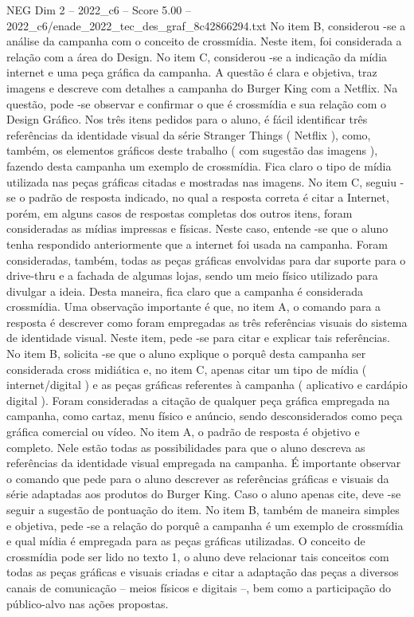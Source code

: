 \begin{textsample}{NEG Dim 2 – 2022\_c6 – Score 5.00 – 2022\_c6/enade\_2022\_tec\_des\_graf\_8c42866294.txt}
No item B, considerou -se a análise da campanha com o conceito de crossmídia.
Neste item, foi considerada a relação com a área do Design.
No item C, considerou -se a indicação da mídia internet e uma peça gráfica da campanha.
A questão é clara e objetiva, traz imagens e descreve com detalhes a campanha do Burger King com a Netflix.
Na questão, pode -se observar e confirmar o que é crossmídia e sua relação com o Design Gráfico.
Nos três itens pedidos para o aluno, é fácil identificar três referências da identidade visual da série Stranger Things ( Netflix ), como, também, os elementos gráficos deste trabalho ( com sugestão das imagens ), fazendo desta campanha um exemplo de crossmídia.
Fica claro o tipo de mídia utilizada nas peças gráficas citadas e mostradas nas imagens.
No item C, seguiu -se o padrão de resposta indicado, no qual a resposta correta é citar a Internet, porém, em alguns casos de respostas completas dos outros itens, foram consideradas as mídias impressas e físicas.
Neste caso, entende -se que o aluno tenha respondido anteriormente que a internet foi usada na campanha.
Foram consideradas, também, todas as peças gráficas envolvidas para dar suporte para o drive-thru e a fachada de algumas lojas, sendo um meio físico utilizado para divulgar a ideia.
Desta maneira, fica claro que a campanha é considerada crossmídia.
Uma observação importante é que, no item A, o comando para a resposta é descrever como foram empregadas as três referências visuais do sistema de identidade visual.
Neste item, pede -se para citar e explicar tais referências.
No item B, solicita -se que o aluno explique o porquê desta campanha ser considerada cross midiática e, no item C, apenas citar um tipo de mídia ( internet/digital ) e as peças gráficas referentes à campanha ( aplicativo e cardápio digital ).
Foram consideradas a citação de qualquer peça gráfica empregada na campanha, como cartaz, menu físico e anúncio, sendo desconsiderados como peça gráfica comercial ou vídeo.
No item A, o padrão de resposta é objetivo e completo.
Nele estão todas as possibilidades para que o aluno descreva as referências da identidade visual empregada na campanha.
É importante observar o comando que pede para o aluno descrever as referências gráficas e visuais da série adaptadas aos produtos do Burger King.
Caso o aluno apenas cite, deve -se seguir a sugestão de pontuação do item.
No item B, também de maneira simples e objetiva, pede -se a relação do porquê a campanha é um exemplo de crossmídia e qual mídia é empregada para as peças gráficas utilizadas.
O conceito de crossmídia pode ser lido no texto 1, o aluno deve relacionar tais conceitos com todas as peças gráficas e visuais criadas e citar a adaptação das peças a diversos canais de comunicação – meios físicos e digitais –, bem como a participação do público-alvo nas ações propostas.

\end{textsample}
